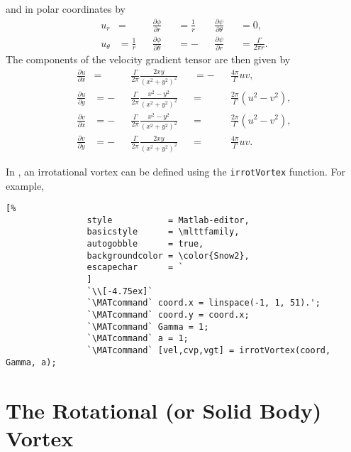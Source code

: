 \documentclass[10pt, twoside]{book}
\begin{document}
			and in polar coordinates by
			\begin{subequations}
			\label{eq:IrrotVortexVelPolar}
				\begin{alignat}{5}
					u_r &= &&\frac{\partial\phi}{\partial r} &&= \frac{1}{r}&&\frac{\partial\psi}{\partial \theta} &&= 0,\label{eq:IrrotVortexVelPolarUr}\\
					u_{\theta} &= \frac{1}{r}&&\frac{\partial\phi}{\partial \theta} &&= -&&\frac{\partial\psi}{\partial r} &&= \frac{\Gamma}{2\pi r}.\label{eq:IrrotVortexVelPolarUt}
				\end{alignat}
			\end{subequations}
			The components of the velocity gradient tensor are then given by
			\begin{subequations}
			\label{eq:IrrotVortexVgt}
				\begin{alignat}{4}
					\frac{\partial u}{\partial x} &= &&\frac{\Gamma}{2\pi}\frac{2xy}{\left(x^2 + y^2\right)^2} &&= -&&\frac{4\pi}{\Gamma}uv,\label{eq:IrrotVortexVgtUx}\\
					\frac{\partial u}{\partial y} &= -&&\frac{\Gamma}{2\pi}\frac{x^2 - y^2}{\left(x^2 + y^2\right)^2} &&= &&\frac{2\pi}{\Gamma}\left(u^2 - v^2\right),\label{eq:IrrotVortexVgtUy}\\
					\frac{\partial v}{\partial x} &= -&&\frac{\Gamma}{2\pi}\frac{x^2 - y^2}{\left(x^2 + y^2\right)^2} &&= &&\frac{2\pi}{\Gamma}\left(u^2 - v^2\right),\label{eq:IrrotVortexVgtVx}\\
					\frac{\partial v}{\partial y} &= -&&\frac{\Gamma}{2\pi}\frac{2xy}{\left(x^2 + y^2\right)^2} &&= &&\frac{4\pi}{\Gamma}uv.\label{eq:IrrotVortexVgtVy}
				\end{alignat}
			\end{subequations}
			
			
			In \MATfluids, an irrotational vortex can be defined using the \texttt{irrotVortex} function. For example,
			\begin{lstlisting}[%
				style           = Matlab-editor,
				basicstyle      = \mlttfamily,
				autogobble      = true,
				backgroundcolor = \color{Snow2},
				escapechar      = `
				]
				`\\[-4.75ex]`
				`\MATcommand` coord.x = linspace(-1, 1, 51).';
				`\MATcommand` coord.y = coord.x;
				`\MATcommand` Gamma = 1;
				`\MATcommand` a = 1;
				`\MATcommand` [vel,cvp,vgt] = irrotVortex(coord, Gamma, a);
			\end{lstlisting}
			
		\section{\label{sec:RotVortex}The Rotational (or Solid Body) Vortex}
			
\end{document}
